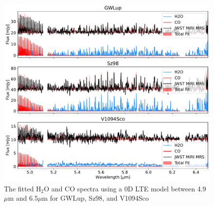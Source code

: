 \documentclass[twoside, single, authoryear, semicolon, 12pt]{lion-msc}
\newcommand{\4}{$_4$}
\newcommand{\3}{$_3$}
\newcommand{\2}{$_2$}
\begin{document}
\begin{figure}[!ht]
    \centering
    \includegraphics[width=\linewidth]{Figures/Fits.pdf}
    \caption{The fitted H\2O and CO spectra using a 0D LTE model between 4.9 $\mu$m and 6.5$\mu$m for GWLup, Sz98, and V1094Sco}
    \label{fig: fits}
\end{figure}
\end{document}
